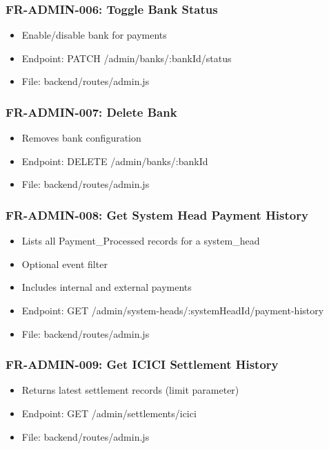 \documentclass[12pt,a4paper]{article}
\begin{document}
\subsubsection{FR-ADMIN-006: Toggle Bank Status}
\begin{itemize}
  \item Enable/disable bank for payments
  \item Endpoint: PATCH /admin/banks/:bankId/status
  \item File: backend/routes/admin.js
\end{itemize}

\subsubsection{FR-ADMIN-007: Delete Bank}
\begin{itemize}
  \item Removes bank configuration
  \item Endpoint: DELETE /admin/banks/:bankId
  \item File: backend/routes/admin.js
\end{itemize}

\subsubsection{FR-ADMIN-008: Get System Head Payment History}
\begin{itemize}
  \item Lists all Payment\_Processed records for a system\_head
  \item Optional event filter
  \item Includes internal and external payments
  \item Endpoint: GET /admin/system-heads/:systemHeadId/payment-history
  \item File: backend/routes/admin.js
\end{itemize}

\subsubsection{FR-ADMIN-009: Get ICICI Settlement History}
\begin{itemize}
  \item Returns latest settlement records (limit parameter)
  \item Endpoint: GET /admin/settlements/icici
  \item File: backend/routes/admin.js
\end{itemize}
\end{document}
